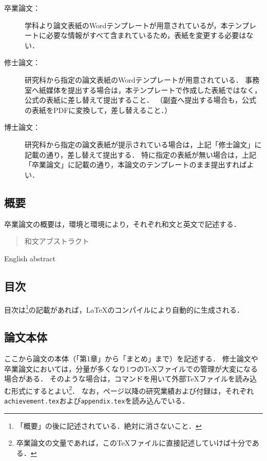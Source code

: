 \documentclass[a4j,11pt]{ujreport}
\begin{document}
\begin{boxnote}
    \begin{description}
        \item[卒業論文：] 学科より論文表紙のWordテンプレートが用意されているが，本テンプレートに必要な情報がすべて含まれているため，表紙を変更する必要はない．
        \item[修士論文：] 研究科から指定の論文表紙のWordテンプレートが用意されている．
        事務室へ紙媒体を提出する場合は，本テンプレートで作成した表紙ではなく，公式の表紙に差し替えて提出すること．
        （副査へ提出する場合も，公式の表紙をPDFに変換して，差し替えること．）
        \item[博士論文：] 研究科から指定の論文表紙が提示されている場合は，上記「修士論文」に記載の通り，差し替えて提出する．
        特に指定の表紙が無い場合は，上記「卒業論文」に記載の通り，本論文のテンプレートのまま提出すればよい．
    \end{description}
\end{boxnote}

\subsection{概要}
卒業論文の概要は，環境と環境により，それぞれ和文と英文で記述する．

\begin{code}
\begin{abstract}
和文アブストラクト
\end{abstract}

\begin{eabstract}
English abstract
\end{eabstract}
\end{code}%

\subsection{目次}
目次は\footnote{「概要」の後に記述されている．絶対に消さないこと．}の記載があれば，{\LaTeX}のコンパイルにより自動的に生成される．

\subsection{論文本体}
ここから論文の本体（「第1章」から「まとめ」まで）を記述する．
修士論文や卒業論文においては，分量が多くなり1つの{\TeX}ファイルでの管理が大変になる場合がある．
そのような場合は，コマンドを用いて外部{\TeX}ファイルを読み込む形式にするとよい\footnote{卒業論文の文量であれば，この{\TeX}ファイルに直接記述していけば十分である．}．
なお，\pageref{chap:Achievement}ページ以降の研究業績および付録は，それぞれ\texttt{achievement.tex}および\texttt{appendix.tex}を読み込んでいる．
\end{document}
